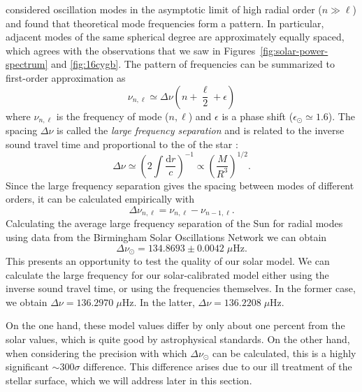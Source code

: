 \citet{1980ApJS...43..469T} considered oscillation modes in the asymptotic limit of high radial order (${n\gg\ell}$) and found that theoretical mode frequencies form a pattern. 
In particular, adjacent modes of the same spherical degree are approximately equally spaced, which agrees with the observations that we saw in Figures~\ref{fig:solar-power-spectrum} and \ref{fig:16cygb}. 
The pattern of frequencies can be summarized to first-order approximation as 
\begin{equation} \label{eq:asymptotic}
    \nu_{n,\ell} \simeq \Delta\nu \left( n + \frac{\ell}{2} + \epsilon \right)
\end{equation}
where $\nu_{n,\ell}$ is the frequency of mode (${n,\ell}$) and $\epsilon$ is a phase shift (${\epsilon_\odot\simeq 1.6}$). 
The spacing ${\Delta\nu}$ is called the \emph{large frequency separation} and is related to the inverse sound travel time and proportional to the  of the star \citep{1986apj...306l..37u, 1995A&A...293...87K}:
\begin{equation}
    \Delta\nu
    \simeq
    \left( 
        2 \int \frac{\text{d}r}{c}
    \right)^{-1}
    \propto
    \left(
        \frac{M}{R^3}
    \right)^{1/2}. 
\end{equation}
Since the large frequency separation gives the spacing between modes of different orders, it can be calculated empirically with
\begin{equation} \label{eq:Dnu}
    \Delta\nu_{n,\ell} 
    =
    \nu_{n,\ell}
    -
    \nu_{n-1,\ell}.
\end{equation}
Calculating the average large frequency separation of the Sun for radial modes using data from the Birmingham Solar Oscillations Network \citep[\emph{BiSON},][]{2009mnras.396l.100b} we can obtain 
\begin{equation}
    \Delta\nu_\odot = 134.8693 \pm 0.0042\;\mu\text{Hz}. 
\end{equation}
This presents an opportunity to test the quality of our solar model. 
We can calculate the large frequency for our solar-calibrated model either using the inverse sound travel time, or using the frequencies themselves. 
In the former case, we obtain ${\Delta\nu = 136.2970\;\mu\text{Hz}}$. 
In the latter, ${\Delta\nu = 136.2208\;\mu\text{Hz}}$. 

On the one hand, these model values differ by only about one percent from the solar values, which is quite good by astrophysical standards. 
On the other hand, when considering the precision with which ${\Delta\nu_{\odot}}$ can be calculated, this is a highly significant ${\sim 300\sigma}$ difference. 
This difference arises due to our ill treatment of the stellar surface, which we will address later in this section. 

